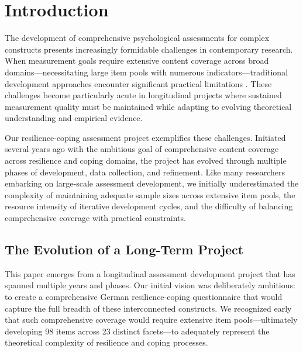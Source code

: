 \documentclass[12pt,a4paper]{article}
\begin{document}
\begin{abstract}
\textbf{Keywords:} AI-supervised development, item response theory, resilience assessment, adaptive testing, longitudinal validation, psychometric comparison

\end{abstract}

\newpage

\section{Introduction}

The development of comprehensive psychological assessments for complex constructs presents increasingly formidable challenges in contemporary research. When measurement goals require extensive content coverage across broad domains—necessitating large item pools with numerous indicators—traditional development approaches encounter significant practical limitations \cite{Embretson2013, VanderLinden2016}. These challenges become particularly acute in longitudinal projects where sustained measurement quality must be maintained while adapting to evolving theoretical understanding and empirical evidence.

Our resilience-coping assessment project exemplifies these challenges. Initiated several years ago with the ambitious goal of comprehensive content coverage across resilience and coping domains, the project has evolved through multiple phases of development, data collection, and refinement. Like many researchers embarking on large-scale assessment development, we initially underestimated the complexity of maintaining adequate sample sizes across extensive item pools, the resource intensity of iterative development cycles, and the difficulty of balancing comprehensive coverage with practical constraints.

\subsection{The Evolution of a Long-Term Project}

This paper emerges from a longitudinal assessment development project that has spanned multiple years and phases. Our initial vision was deliberately ambitious: to create a comprehensive German resilience-coping questionnaire that would capture the full breadth of these interconnected constructs. We recognized early that such comprehensive coverage would require extensive item pools—ultimately developing 98 items across 23 distinct facets—to adequately represent the theoretical complexity of resilience and coping processes.
\end{document}
